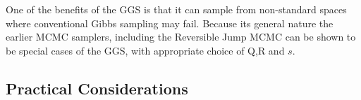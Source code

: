 
One of the benefits of the GGS is that it can sample from non-standard spaces where conventional Gibbs sampling may fail. Because its general nature the earlier MCMC samplers, including the Reversible Jump MCMC can be shown to be special cases of the GGS, with appropriate choice of Q,R and $s$.  %

\subsection{Practical Considerations}



